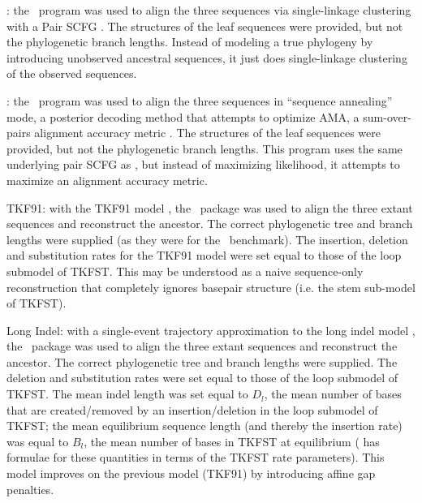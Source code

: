 \documentclass[10pt]{article}
\begin{document}
\begin{description}
\item{\stemloc:} the \stemloc\ program was used to align the three sequences via single-linkage clustering with a Pair SCFG \cite{Holmes2005}.
The structures of the leaf sequences were provided, but not the phylogenetic branch lengths.
Instead of modeling a true phylogeny by introducing unobserved ancestral sequences, it just does single-linkage clustering of the observed sequences.
\item{\stemlocama:} the \stemloc\ program was used to align the three sequences in ``sequence annealing'' mode,
 a posterior decoding method that attempts to optimize AMA, a sum-over-pairs alignment accuracy metric \cite{BradleyPachterHolmes2008}.
The structures of the leaf sequences were provided, but not the phylogenetic branch lengths.
This program uses the same underlying pair SCFG as \stemloc, but instead of maximizing likelihood, it attempts to maximize an alignment accuracy metric.
\item{TKF91:} with the TKF91 model \cite{ThorneEtal91}, the \handel\ package \cite{HolmesBruno2001,Holmes2003,Holmes2007} was used to align the three extant sequences and reconstruct the ancestor.
The correct phylogenetic tree and branch lengths were supplied (as they were for the \indiegram\ benchmark).
The insertion, deletion and substitution rates for the TKF91 model were set equal to those of the loop submodel of TKFST.
This may be understood as a naive sequence-only reconstruction that completely ignores basepair structure (i.e. the stem sub-model of TKFST).
\item{Long Indel:} with a single-event trajectory approximation to the long indel model \cite{MiklosLunterHolmes2004}, the \handel\ package was used to align the three extant sequences and reconstruct the ancestor.
The correct phylogenetic tree and branch lengths were supplied.
The deletion and substitution rates were set equal to those of the loop submodel of TKFST.
The mean indel length was set equal to $D_l$, the mean number of bases that are created/removed by an insertion/deletion in the loop submodel of TKFST;
the mean equilibrium sequence length (and thereby the insertion rate) was equal to $B_l$, the mean number of bases in TKFST at equilibrium
( has formulae for these quantities in terms of the TKFST rate parameters).
This model improves on the previous model (TKF91) by introducing affine gap penalties.
\end{description}
\end{document}
